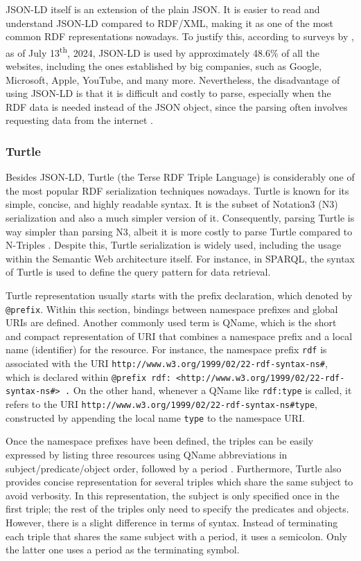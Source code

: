 JSON-LD itself is an extension of the plain JSON. It is easier to read and understand JSON-LD compared to RDF/XML, making it as one of the most common RDF representations nowadays. To justify this, according to surveys by \cite{W3TechsJSONLD}, as of July 13\textsuperscript{th}, 2024, JSON-LD is used by approximately 48.6\% of all the websites, including the ones established by big companies, such as Google, Microsoft, Apple, YouTube, and many more. Nevertheless, the disadvantage of using JSON-LD is that it is difficult and costly to parse, especially when the RDF data is needed instead of the JSON object, since the parsing often involves requesting data from the internet \citep{rdfser2019}. 

\subsubsection{Turtle}
\label{turtle}
Besides JSON-LD, Turtle (the Terse RDF Triple Language) is considerably one of the most popular RDF serialization techniques nowadays. Turtle is known for its simple, concise, and highly readable syntax. It is the subset of Notation3 (N3) serialization and also a much simpler version of it. Consequently, parsing Turtle is way simpler than parsing N3, albeit it is more costly to parse Turtle compared to N-Triples \citep{rdfser2019}. Despite this, Turtle serialization is widely used, including the usage within the Semantic Web architecture itself. For instance, in SPARQL, the syntax of Turtle is used to define the query pattern for data retrieval.

Turtle representation usually starts with the prefix declaration, which denoted by \texttt{@prefix}. Within this section, bindings between namespace prefixes and global URIs are defined. Another commonly used term is QName, which is the short and compact representation of URI that combines a namespace prefix and a local name (identifier) for the resource. For instance, the namespace prefix \texttt{rdf} is associated with the URI \texttt{http://www.w3.org/1999/02/22-rdf-syntax-ns\#}, which is declared within \texttt{@prefix rdf: <http://www.w3.org/1999/02/22-rdf-syntax-ns\#> .} On the other hand, whenever a QName like \texttt{rdf:type} is called, it refers to the URI \texttt{http://www.w3.org/1999/02/22-rdf-syntax-ns\#type}, constructed by appending the local name \texttt{type} to the namespace URI.

Once the namespace prefixes have been defined, the triples can be easily expressed by listing three resources using QName abbreviations in subject/predicate/object order, followed by a period \citep{swont2011}. Furthermore, Turtle also provides concise representation for several triples which share the same subject to avoid verbosity. In this representation, the subject is only specified once in the first triple; the rest of the triples only need to specify the predicates and objects. However, there is a slight difference in terms of syntax. Instead of terminating each triple that shares the same subject with a period, it uses a semicolon. Only the latter one uses a period as the terminating symbol.

